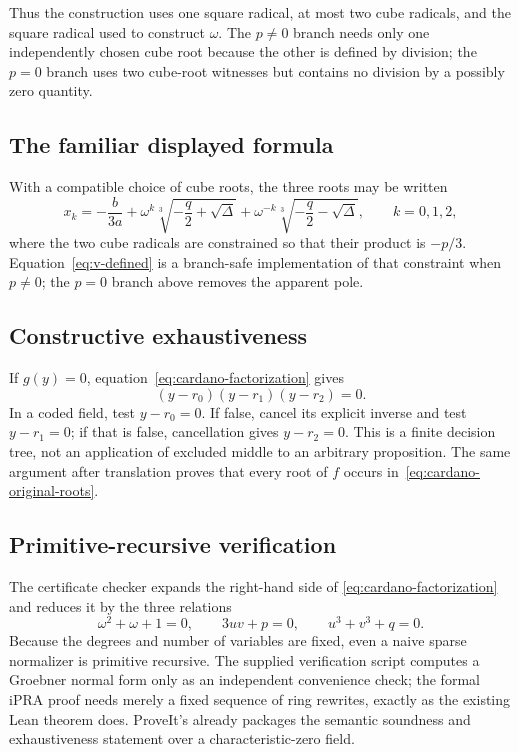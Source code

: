 Thus the construction uses one square radical, at most two cube radicals, and
the square radical used to construct $\omega$.  The $p\ne0$ branch needs only
one independently chosen cube root because the other is defined by division;
the $p=0$ branch uses two cube-root witnesses but contains no division by a
possibly zero quantity.

\subsection{The familiar displayed formula}

With a compatible choice of cube roots, the three roots may be written
\[
 x_k=-\frac{b}{3a}
 +\omega^k\sqrt[3]{-\frac q2+\sqrt\Delta}
 +\omega^{-k}\sqrt[3]{-\frac q2-\sqrt\Delta},
 \qquad k=0,1,2,
 \tag{C12}\label{eq:classical-cardano}
\]
where the two cube radicals are constrained so that their product is $-p/3$.
Equation~\eqref{eq:v-defined} is a branch-safe implementation of that
constraint when $p\ne0$; the $p=0$ branch above removes the apparent pole.

\subsection{Constructive exhaustiveness}

If $g(y)=0$, equation~\eqref{eq:cardano-factorization} gives
\[
 (y-r_0)(y-r_1)(y-r_2)=0.
\]
In a coded field, test $y-r_0=0$.  If false, cancel its explicit inverse and
test $y-r_1=0$; if that is false, cancellation gives $y-r_2=0$.  This is a
finite decision tree, not an application of excluded middle to an arbitrary
proposition.  The same argument after translation proves that every root of
$f$ occurs in~\eqref{eq:cardano-original-roots}.

\subsection{Primitive-recursive verification}

The certificate checker expands the right-hand side of
\eqref{eq:cardano-factorization} and reduces it by the three relations
\[
 \omega^2+\omega+1=0,
 \qquad
 3uv+p=0,
 \qquad
 u^3+v^3+q=0.
\]
Because the degrees and number of variables are fixed, even a naive sparse
normalizer is primitive recursive.  The supplied verification script computes
a Groebner normal form only as an independent convenience check; the formal
iPRA proof needs merely a fixed sequence of ring rewrites, exactly as the
existing Lean theorem  does.  ProveIt's
 already packages the semantic soundness and
exhaustiveness statement over a characteristic-zero field.
